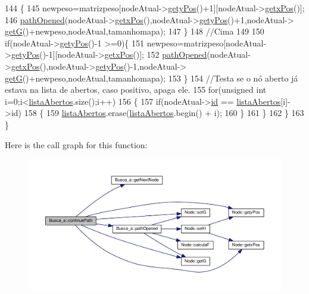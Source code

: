 \begin{DoxyCode}
144         \{
145             newpeso=matrizpeso[nodeAtual->\hyperlink{classNode_a7d26325d2355b29184cd6b428a78508b}{getyPos}()+1][nodeAtual->\hyperlink{classNode_a81aba8cc7d7ebd60051bb7cba210f587}{getxPos}()];
146             \hyperlink{classBusca__a_a762c5b4a508658689ad8c7b218c6238c}{pathOpened}(nodeAtual->\hyperlink{classNode_a81aba8cc7d7ebd60051bb7cba210f587}{getxPos}(),nodeAtual->\hyperlink{classNode_a7d26325d2355b29184cd6b428a78508b}{getyPos}()+1,nodeAtual->
      \hyperlink{classNode_ab72b743b5abe69381e9066f4225793d2}{getG}()+newpeso,nodeAtual,tamanhomapa);
147         \}
148         \textcolor{comment}{//Cima}
149         
150         \textcolor{keywordflow}{if}(nodeAtual->\hyperlink{classNode_a7d26325d2355b29184cd6b428a78508b}{getyPos}()-1 >=0)\{
151             newpeso=matrizpeso[nodeAtual->\hyperlink{classNode_a7d26325d2355b29184cd6b428a78508b}{getyPos}()-1][nodeAtual->\hyperlink{classNode_a81aba8cc7d7ebd60051bb7cba210f587}{getxPos}()];
152             \hyperlink{classBusca__a_a762c5b4a508658689ad8c7b218c6238c}{pathOpened}(nodeAtual->\hyperlink{classNode_a81aba8cc7d7ebd60051bb7cba210f587}{getxPos}(),nodeAtual->\hyperlink{classNode_a7d26325d2355b29184cd6b428a78508b}{getyPos}()-1,nodeAtual->
      \hyperlink{classNode_ab72b743b5abe69381e9066f4225793d2}{getG}()+newpeso,nodeAtual,tamanhomapa);
153         \}
154         \textcolor{comment}{//Testa se o nó aberto já estava na lista de abertos, caso positivo, apaga ele.}
155         \textcolor{keywordflow}{for}(\textcolor{keywordtype}{unsigned} \textcolor{keywordtype}{int} i=0;i<\hyperlink{classBusca__a_a75cdf1a045b9836fd8e61604846fa436}{listaAbertos}.size();i++)
156         \{
157             \textcolor{keywordflow}{if}(nodeAtual->\hyperlink{classNode_a59a543130a10c95f1e8642cf8c5645e8}{id} == \hyperlink{classBusca__a_a75cdf1a045b9836fd8e61604846fa436}{listaAbertos}[i]->id)
158             \{
159                 \hyperlink{classBusca__a_a75cdf1a045b9836fd8e61604846fa436}{listaAbertos}.erase(\hyperlink{classBusca__a_a75cdf1a045b9836fd8e61604846fa436}{listaAbertos}.begin() + i);
160             \}
161         \}
162     \}       
163 \}
\end{DoxyCode}


Here is the call graph for this function\+:
\nopagebreak
\begin{figure}[H]
\begin{center}
\leavevmode
\includegraphics[width=350pt]{classBusca__a_adb02d829d41341fdb8670207b35a0bb7_cgraph}
\end{center}
\end{figure}


